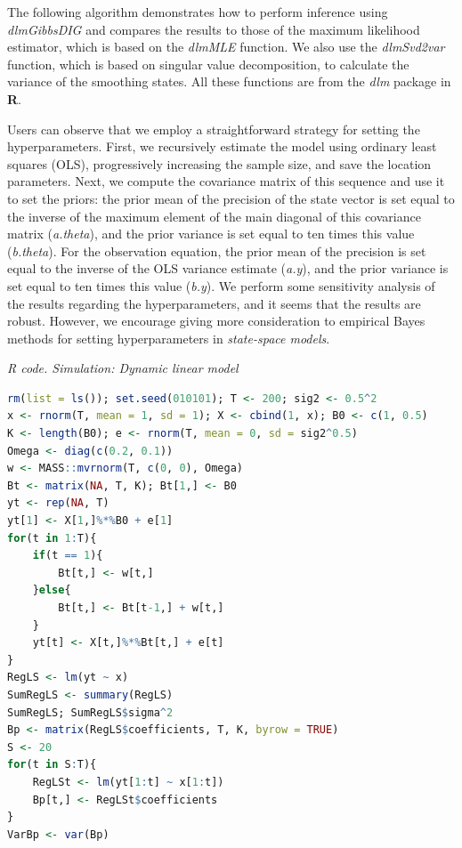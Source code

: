 The following algorithm demonstrates how to perform inference using \textit{dlmGibbsDIG} and compares the results to those of the maximum likelihood estimator, which is based on the \textit{dlmMLE} function. We also use the \textit{dlmSvd2var} function, which is based on singular value decomposition, to calculate the variance of the smoothing states. All these functions are from the \textit{dlm} package in \textbf{R}.

Users can observe that we employ a straightforward strategy for setting the hyperparameters. First, we recursively estimate the model using ordinary least squares (OLS), progressively increasing the sample size, and save the location parameters. Next, we compute the covariance matrix of this sequence and use it to set the priors: the prior mean of the precision of the state vector is set equal to the inverse of the maximum element of the main diagonal of this covariance matrix (\textit{a.theta}), and the prior variance is set equal to ten times this value (\textit{b.theta}). For the observation equation, the prior mean of the precision is set equal to the inverse of the OLS variance estimate (\textit{a.y}), and the prior variance is set equal to ten times this value (\textit{b.y}). We perform some sensitivity analysis of the results regarding the hyperparameters, and it seems that the results are robust. However, we encourage giving more consideration to empirical Bayes methods for setting hyperparameters in \textit{state-space models}.

\begin{tcolorbox}[enhanced,width=4.67in,center upper,
	fontupper=\large\bfseries,drop shadow southwest,sharp corners]
	\textit{R code. Simulation: Dynamic linear model}
	\begin{VF}
		\begin{lstlisting}[language=R]
rm(list = ls()); set.seed(010101); T <- 200; sig2 <- 0.5^2
x <- rnorm(T, mean = 1, sd = 1); X <- cbind(1, x); B0 <- c(1, 0.5)
K <- length(B0); e <- rnorm(T, mean = 0, sd = sig2^0.5)
Omega <- diag(c(0.2, 0.1))
w <- MASS::mvrnorm(T, c(0, 0), Omega)
Bt <- matrix(NA, T, K); Bt[1,] <- B0
yt <- rep(NA, T) 
yt[1] <- X[1,]%*%B0 + e[1]
for(t in 1:T){
	if(t == 1){
		Bt[t,] <- w[t,]
	}else{
		Bt[t,] <- Bt[t-1,] + w[t,]
	}
	yt[t] <- X[t,]%*%Bt[t,] + e[t]
}
RegLS <- lm(yt ~ x)
SumRegLS <- summary(RegLS)
SumRegLS; SumRegLS$sigma^2  
Bp <- matrix(RegLS$coefficients, T, K, byrow = TRUE)
S <- 20
for(t in S:T){
	RegLSt <- lm(yt[1:t] ~ x[1:t])
	Bp[t,] <- RegLSt$coefficients 
}
VarBp <- var(Bp)
\end{lstlisting}
	\end{VF}
\end{tcolorbox} 

